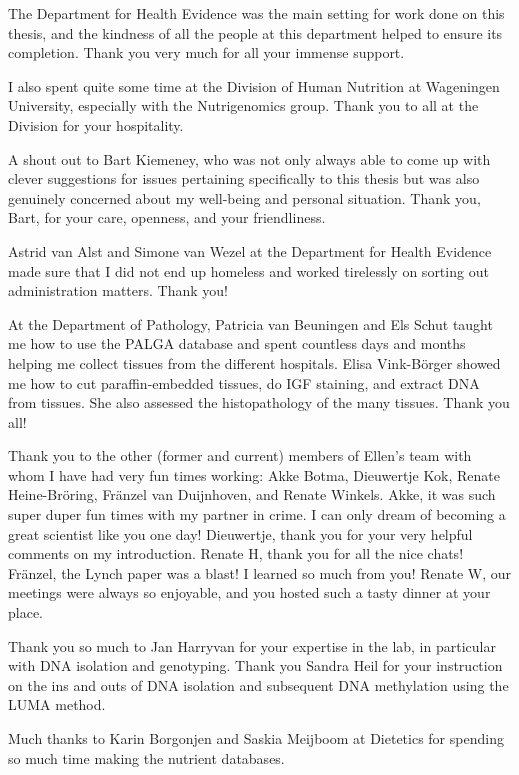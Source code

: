 \noindent The Department for Health Evidence was the main setting for work done on this thesis, and the kindness of all the people at this department helped to ensure its completion. Thank you very much for all your immense support.

\noindent I also spent quite some time at the Division of Human Nutrition at Wageningen University, especially with the Nutrigenomics group. Thank you to all at the Division for your hospitality.

\noindent A shout out to Bart Kiemeney, who was not only always able to come up with clever suggestions for issues pertaining specifically to this thesis but was also genuinely concerned about my well-being and personal situation. Thank you, Bart, for your care, openness, and your friendliness.

\noindent Astrid van Alst and Simone van Wezel at the Department for Health Evidence made sure that I did not end up homeless and worked tirelessly on sorting out administration matters. Thank you!

\noindent At the Department of Pathology, Patricia van Beuningen and Els Schut taught me how to use the PALGA database and spent countless days and months helping me collect tissues from the different hospitals. Elisa Vink-B{\"o}rger showed me how to cut paraffin-embedded tissues, do IGF staining, and extract DNA from tissues. She also assessed the histopathology of the many tissues. Thank you all!

\noindent Thank you to the other (former and current) members of Ellen's team with whom I have had very fun times working: Akke Botma, Dieuwertje Kok, Renate Heine-Br{\"o}ring, Fr{\"a}nzel van Duijnhoven, and Renate Winkels. Akke, it was such super duper fun times with my partner in crime. I can only dream of becoming a great scientist like you one day! Dieuwertje, thank you for your very helpful comments on my introduction. Renate H, thank you for all the nice chats! Fr{\"a}nzel, the Lynch paper was a blast! I learned so much from you! Renate W, our meetings were always so enjoyable, and you hosted such a tasty dinner at your place.

\noindent Thank you so much to Jan Harryvan for your expertise in the lab, in particular with DNA isolation and genotyping. Thank you Sandra Heil for your instruction on the ins and outs of DNA isolation and subsequent DNA methylation using the LUMA method.

\noindent Much thanks to Karin Borgonjen and Saskia Meijboom at Dietetics for spending so much time making the nutrient databases.

